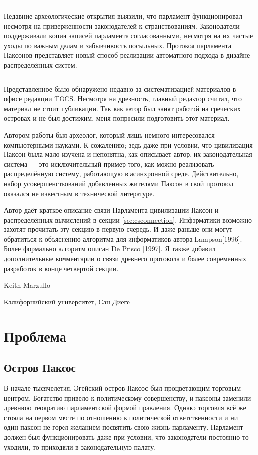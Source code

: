 \documentclass[12pt, a4paper]{article} %
\begin{document}
\noindent\rule{\textwidth}{0.4pt}
Недавние археологические открытия выявили, что парламент функционировал несмотря на приверженности законодателей к странствованиям. Законодатели поддерживали копии записей парламента согласованными, несмотря на их частые уходы по важным делам и забывчивость посыльных. Протокол парламента Паксонов представляет новый способ реализации автоматного подхода в дизайне распределённых систем.\\
\noindent\rule{\textwidth}{0.4pt}

Представленное было обнаружено недавно за систематизацией материалов в офисе редакции TOCS. Несмотря на древность, главный редактор считал, что материал не стоит публикации. Так как автор был занят работой на греческих островах и не был достижим, меня попросили подготовить этот материал.

Автором работы был археолог, который лишь немного интересовался компьютерными науками. К сожалению; ведь даже при условии, что цивилизация Паксон была мало изучена и непонятна, как описывает автор, их законодательная система --- это исключительный пример того, как можно реализовать распределённую систему, работающую в асинхронной среде. Действительно, набор усовершенствований добавленных жителями Паксон в свой протокол оказался не известным в технической литературе.

Автор даёт краткое описание связи Парламента цивилизации Паксон и распределённых вычислений в секции \ref{sec:csconnection}. Информатики возможно захотят прочитать эту секцию в первую очередь. И даже раньше они могут обратиться к объяснению алгоритма для информатиков автора Lampson[1996]. Более формально алгоритм описан De Prisco [1997]. Я также добавил дополнительные комментарии о связи древнего протокола и более современных разработок в конце четвертой секции.

\begin{flushright}
Keith Marzullo

Калифорнийский университет, Сан Диего
\end{flushright}

\newpage
\section{Проблема}
\subsection{Остров Паксос}

В начале тысячелетия, Эгейский остров Паксос был процветающим торговым центром. Богатство привело к политическому совершенству, и паксоны заменили древнюю теократию парламентской формой правления. Однако торговля всё же стояла на первом месте по отношению к политической ответственности и ни один паксон не горел желанием посвятить свою жизнь парламенту. Парламент должен был функционировать даже при условии, что законодатели постоянно то уходили, то приходили в законодательную палату.
\end{document}
